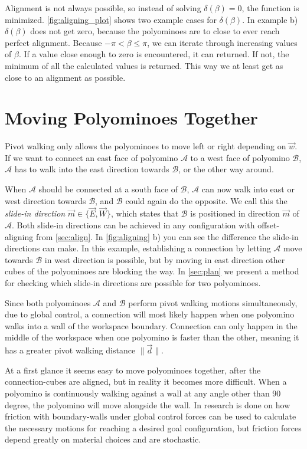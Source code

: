 Alignment is not always possible, so instead of solving $\delta(\beta) = 0$, the function is minimized.
\autoref{fig:aligning_plot} shows two example cases for $\delta(\beta)$.
In example b) $\delta(\beta)$ does not get zero, because the polyominoes are to close to ever reach perfect alignment.
Because $-\pi < \beta \leq \pi$, we can iterate through increasing values of $\beta$.
If a value close enough to zero is encountered, it can returned.
If not, the minimum of all the calculated values is returned.
This way we at least get as close to an alignment as possible.


\section{Moving Polyominoes Together}
\label{sec:walk_wait}

Pivot walking only allows the polyominoes to move left or right depending on $\vec{w}$.
If we want to connect an east face of polyomino $\mathcal{A}$ to a west face of polyomino $\mathcal{B}$, $\mathcal{A}$ has to walk into the east direction towards $\mathcal{B}$, or the other way around.

When $\mathcal{A}$ should be connected at a south face of $\mathcal{B}$, $\mathcal{A}$ can now walk into east or west direction towards $\mathcal{B}$, and $\mathcal{B}$ could again do the opposite.
We call this the \textit{slide-in direction} $\vec{m} \in \{\vec{E}, \vec{W}\}$, which states that $\mathcal{B}$ is positioned in direction $\vec{m}$ of $\mathcal{A}$.
Both slide-in directions can be achieved in any configuration with offset-aligning from \autoref{sec:align}.
In \autoref{fig:aligning} b) you can see the difference the slide-in directions can make.
In this example, establishing a connection by letting $\mathcal{A}$ move towards $\mathcal{B}$ in west direction is possible, but by moving in east direction other cubes of the polyominoes are blocking the way.
In \autoref{sec:plan} we present a method for checking which slide-in directions are possible for two polyominoes. 

Since both polyominoes $\mathcal{A}$ and $\mathcal{B}$ perform pivot walking motions simultaneously, due to global control, a connection will most likely happen when one polyomino walks into a wall of the workspace boundary.
Connection can only happen in the middle of the workspace when one polyomino is faster than the other, meaning it has a greater pivot walking distance $\lVert \vec{d} \rVert$.

At a first glance it seems easy to move polyominoes together, after the connection-cubes are aligned, but in reality it becomes more difficult.
When a polyomino is continuously walking against a wall at any angle other than 90 degree, the polyomino will move alongside the wall.
In \cite{schmidt2020} research is done on how friction with boundary-walls under global control forces can be used to calculate the necessary motions for reaching a desired goal configuration, but friction forces depend greatly on material choices and are stochastic.

